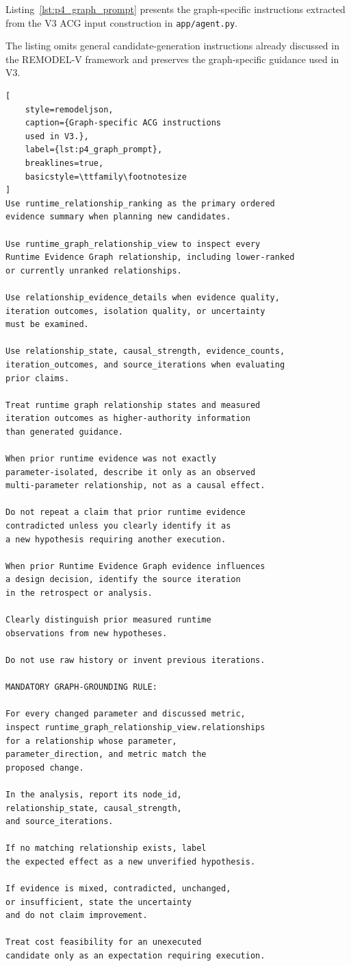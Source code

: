 Listing~\ref{lst:p4_graph_prompt}
presents the graph-specific instructions
extracted from the V3 ACG input
construction in \texttt{app/agent.py}.

The listing omits general candidate-generation
instructions already discussed in the
REMODEL-V framework and preserves the
graph-specific guidance used in V3.

\begin{lstlisting}[
    style=remodeljson,
    caption={Graph-specific ACG instructions
    used in V3.},
    label={lst:p4_graph_prompt},
    breaklines=true,
    basicstyle=\ttfamily\footnotesize
]
Use runtime_relationship_ranking as the primary ordered
evidence summary when planning new candidates.

Use runtime_graph_relationship_view to inspect every
Runtime Evidence Graph relationship, including lower-ranked
or currently unranked relationships.

Use relationship_evidence_details when evidence quality,
iteration outcomes, isolation quality, or uncertainty
must be examined.

Use relationship_state, causal_strength, evidence_counts,
iteration_outcomes, and source_iterations when evaluating
prior claims.

Treat runtime graph relationship states and measured
iteration outcomes as higher-authority information
than generated guidance.

When prior runtime evidence was not exactly
parameter-isolated, describe it only as an observed
multi-parameter relationship, not as a causal effect.

Do not repeat a claim that prior runtime evidence
contradicted unless you clearly identify it as
a new hypothesis requiring another execution.

When prior Runtime Evidence Graph evidence influences
a design decision, identify the source iteration
in the retrospect or analysis.

Clearly distinguish prior measured runtime
observations from new hypotheses.

Do not use raw history or invent previous iterations.

MANDATORY GRAPH-GROUNDING RULE:

For every changed parameter and discussed metric,
inspect runtime_graph_relationship_view.relationships
for a relationship whose parameter,
parameter_direction, and metric match the
proposed change.

In the analysis, report its node_id,
relationship_state, causal_strength,
and source_iterations.

If no matching relationship exists, label
the expected effect as a new unverified hypothesis.

If evidence is mixed, contradicted, unchanged,
or insufficient, state the uncertainty
and do not claim improvement.

Treat cost feasibility for an unexecuted
candidate only as an expectation requiring execution.
\end{lstlisting}

